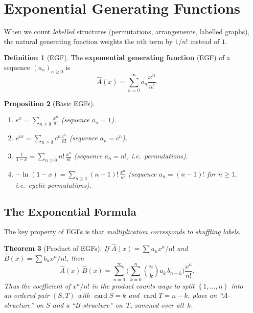 \documentclass[12pt,a4paper,openany]{book}
\theoremstyle{definition}
\newtheorem{definition}{Definition}[chapter]
\theoremstyle{plain}
\newtheorem{theorem}[definition]{Theorem}
\newtheorem{proposition}[definition]{Proposition}
\theoremstyle{remark}
\newcommand{\set}[1]{\left\{#1\right\}}
\DeclareMathOperator{\card}{card}
\begin{document}

\section{Exponential Generating Functions}\label{sec:egf}

When we count \emph{labelled} structures (permutations, arrangements,
labelled graphs), the natural generating function weights the $n$th
term by $1/n!$ instead of $1$.

\begin{definition}[EGF]\label{def:egf}
The \textbf{exponential generating function} (EGF) of a sequence
$(a_n)_{n \ge 0}$ is
\[
  \hat{A}(x) = \sum_{n=0}^{\infty} a_n \frac{x^n}{n!}.
\]
\end{definition}

\begin{proposition}[Basic EGFs]\label{prop:egf-catalogue}
\begin{enumerate}[label=(\roman*)]
  \item $e^x = \sum_{n\ge 0}\frac{x^n}{n!}$
    \quad (sequence $a_n = 1$).
  \item $e^{cx} = \sum_{n\ge 0}c^n\frac{x^n}{n!}$
    \quad (sequence $a_n = c^n$).
  \item $\frac{1}{1-x} = \sum_{n\ge 0}n!\,\frac{x^n}{n!}$
    \quad (sequence $a_n = n!$, i.e.\ permutations).
  \item $\displaystyle -\ln(1-x) = \sum_{n\ge 1}(n-1)!\,\frac{x^n}{n!}$
    \quad (sequence $a_n = (n-1)!$ for $n\ge 1$, i.e.\ cyclic
    permutations).
\end{enumerate}
\end{proposition}

\subsection{The Exponential Formula}\label{ssec:exponential-formula}

The key property of EGFs is that \emph{multiplication corresponds to
shuffling labels}.

\begin{theorem}[Product of EGFs]\label{thm:egf-product}
If $\hat{A}(x) = \sum a_n x^n/n!$ and $\hat{B}(x) = \sum b_n x^n/n!$,
then
\[
  \hat{A}(x)\,\hat{B}(x)
  = \sum_{n=0}^{\infty}\Biggl(\sum_{k=0}^{n}\binom{n}{k}a_k\,b_{n-k}\Biggr)
  \frac{x^n}{n!}.
\]
Thus the coefficient of $x^n/n!$ in the product counts ways to split
$\set{1,\dots,n}$ into an ordered pair $(S,T)$ with $\card{S}=k$ and
$\card{T}=n-k$, place an ``$A$-structure'' on $S$ and a
``$B$-structure'' on~$T$, summed over all~$k$.
\end{theorem}
\end{document}
